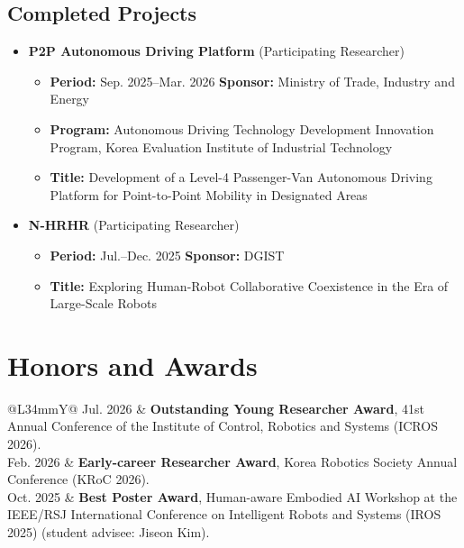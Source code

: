 \documentclass[10pt,a4paper]{article}
\newcommand{\daterow}[2]{#1 & #2 \\[2.2pt]}
\begin{document}
\subsection{Completed Projects}
\begin{itemize}[leftmargin=4.5mm,itemsep=4pt]
\item \textbf{P2P Autonomous Driving Platform} (Participating Researcher)
  \begin{itemize}[label=--,leftmargin=5mm,itemsep=0pt,topsep=1pt]
  \item \textbf{Period:} Sep. 2025--Mar. 2026 \quad \textbf{Sponsor:} Ministry of Trade, Industry and Energy
  \item \textbf{Program:} Autonomous Driving Technology Development Innovation Program, Korea Evaluation Institute of Industrial Technology
  \item \textbf{Title:} Development of a Level-4 Passenger-Van Autonomous Driving Platform for Point-to-Point Mobility in Designated Areas
  \end{itemize}
\item \textbf{N-HRHR} (Participating Researcher)
  \begin{itemize}[label=--,leftmargin=5mm,itemsep=0pt,topsep=1pt]
  \item \textbf{Period:} Jul.--Dec. 2025 \quad \textbf{Sponsor:} DGIST
  \item \textbf{Title:} Exploring Human-Robot Collaborative Coexistence in the Era of Large-Scale Robots
  \end{itemize}
\end{itemize}

\section{Honors and Awards}
\begin{tabularx}{\textwidth}{@{}L{34mm}Y@{}}
\daterow{Jul. 2026}{\textbf{Outstanding Young Researcher Award}, 41st Annual Conference of the Institute of Control, Robotics and Systems (ICROS 2026).}
\daterow{Feb. 2026}{\textbf{Early-career Researcher Award}, Korea Robotics Society Annual Conference (KRoC 2026).}
\daterow{Oct. 2025}{\textbf{Best Poster Award}, Human-aware Embodied AI Workshop at the IEEE/RSJ International Conference on Intelligent Robots and Systems (IROS 2025) (student advisee: Jiseon Kim).}
\end{tabularx}
\end{document}
